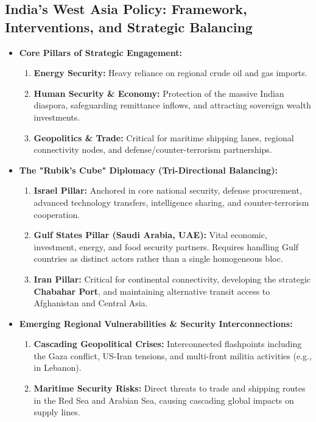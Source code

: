 \subsection{India's West Asia Policy: Framework, Interventions, and Strategic Balancing}
\begin{itemize}
    \item \textbf{Core Pillars of Strategic Engagement:}
    \begin{enumerate}
        \item \textbf{Energy Security:} Heavy reliance on regional crude oil and gas imports.
        \item \textbf{Human Security \& Economy:} Protection of the massive Indian diaspora, safeguarding remittance inflows, and attracting sovereign wealth investments.
        \item \textbf{Geopolitics \& Trade:} Critical for maritime shipping lanes, regional connectivity nodes, and defense/counter-terrorism partnerships.
    \end{enumerate}

    \item \textbf{The "Rubik's Cube" Diplomacy (Tri-Directional Balancing):}
    \begin{enumerate}
        \item \textbf{Israel Pillar:} Anchored in core national security, defense procurement, advanced technology transfers, intelligence sharing, and counter-terrorism cooperation.
        \item \textbf{Gulf States Pillar (Saudi Arabia, UAE):} Vital economic, investment, energy, and food security partners. Requires handling Gulf countries as distinct actors rather than a single homogeneous bloc.
        \item \textbf{Iran Pillar:} Critical for continental connectivity, developing the strategic \textbf{Chabahar Port}, and maintaining alternative transit access to Afghanistan and Central Asia.
    \end{enumerate}

    \item \textbf{Emerging Regional Vulnerabilities \& Security Interconnections:}
    \begin{enumerate}
        \item \textbf{Cascading Geopolitical Crises:} Interconnected flashpoints including the Gaza conflict, US-Iran tensions, and multi-front militia activities (e.g., in Lebanon).
        \item \textbf{Maritime Security Risks:} Direct threats to trade and shipping routes in the Red Sea and Arabian Sea, causing cascading global impacts on supply lines.
    \end{enumerate}


\end{itemize}
